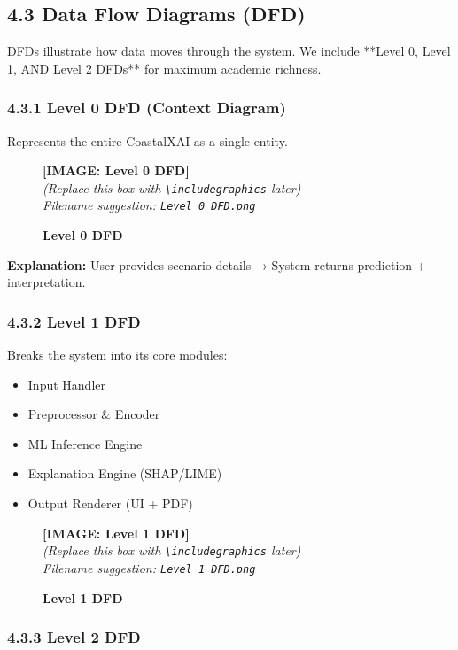\documentclass[12pt, a4paper]{article}
\newcommand{\imageplaceholder}[2]{
  \begin{figure}[H]
    \centering
    \begin{tcolorbox}[colback=white, colframe=black, width=0.8\textwidth, arc=0mm, boxrule=1pt]
      \centering
      \vspace{#2}
      \textbf{\Large [IMAGE: #1]}\\
      \vspace{0.5cm}
      \textit{(Replace this box with \texttt{\textbackslash includegraphics} later)}\\
      \textit{Filename suggestion: \texttt{#1.png}}
      \vspace{#2}
    \end{tcolorbox}
    \caption{\textbf{#1}}
    \label{fig:#1}
  \end{figure}
}
\begin{document}
\subsection{\textbf{4.3 Data Flow Diagrams (DFD)}}

DFDs illustrate how data moves through the system.  
We include **Level 0, Level 1, AND Level 2 DFDs** for maximum academic richness.

\subsubsection{\textbf{4.3.1 Level 0 DFD (Context Diagram)}}

Represents the entire CoastalXAI as a single entity.

\imageplaceholder{Level 0 DFD}{5cm}

\noindent
\textbf{Explanation:}  
User provides scenario details → System returns prediction + interpretation.

\subsubsection{\textbf{4.3.2 Level 1 DFD}}

Breaks the system into its core modules:

\begin{itemize}
    \item Input Handler
    \item Preprocessor & Encoder
    \item ML Inference Engine
    \item Explanation Engine (SHAP/LIME)
    \item Output Renderer (UI + PDF)
\end{itemize}

\imageplaceholder{Level 1 DFD}{6cm}

\subsubsection{\textbf{4.3.3 Level 2 DFD}}
\end{document}
